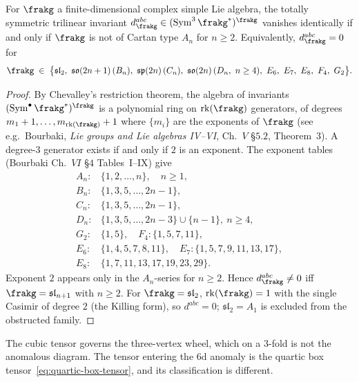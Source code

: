\begin{lemma}[Classification of simple $\frakg$ with $d^{abc}_\frakg = 0$]
\label{lem:dabc-vanishing-classification}
For $\frakg$ a finite-dimensional complex simple Lie algebra, the
totally symmetric trilinear invariant
$d^{abc}_\frakg \in (\operatorname{Sym}^3 \frakg^*)^\frakg$
vanishes identically if and only if $\frakg$ is not of Cartan type
$A_n$ for $n \geq 2$. Equivalently, $d^{abc}_\frakg = 0$ for
\[
 \frakg \;\in\; \bigl\{ \mathfrak{sl}_2,\ \mathfrak{so}(2n+1)\,(B_n),\ \mathfrak{sp}(2n)\,(C_n),\ \mathfrak{so}(2n)\,(D_n,\ n \geq 4),\ E_6,\ E_7,\ E_8,\ F_4,\ G_2 \bigr\}.
\]
\end{lemma}

\begin{proof}
By Chevalley's restriction theorem, the algebra of invariants
$(\operatorname{Sym}^\bullet \frakg^*)^\frakg$ is a polynomial ring on
$\operatorname{rk}(\frakg)$ generators, of degrees $m_1 + 1, \ldots, m_{\operatorname{rk}(\frakg)} + 1$
where $\{m_i\}$ are the exponents of $\frakg$ (see e.g.~Bourbaki,
\emph{Lie groups and Lie algebras IV--VI}, Ch.~$V$ \S$5.2$, Theorem~$3$).
A degree-$3$ generator exists if and only if $2$ is an exponent. The
exponent tables (Bourbaki Ch.~$VI$ \S$4$ Tables~I--IX) give
\[
\begin{array}{rl}
A_n: & \{1, 2, \ldots, n\}, \quad n \geq 1, \\
B_n: & \{1, 3, 5, \ldots, 2n-1\}, \\
C_n: & \{1, 3, 5, \ldots, 2n-1\}, \\
D_n: & \{1, 3, 5, \ldots, 2n-3\} \cup \{n - 1\},\ n \geq 4, \\
G_2: & \{1, 5\}, \quad F_4: \{1, 5, 7, 11\}, \\
E_6: & \{1, 4, 5, 7, 8, 11\}, \quad E_7: \{1, 5, 7, 9, 11, 13, 17\}, \\
E_8: & \{1, 7, 11, 13, 17, 19, 23, 29\}.
\end{array}
\]
Exponent $2$ appears only in the $A_n$-series for $n \geq 2$. Hence
$d^{abc}_\frakg \neq 0$ iff $\frakg = \mathfrak{sl}_{n+1}$ with $n \geq 2$.
For $\frakg = \mathfrak{sl}_2$, $\operatorname{rk}(\frakg) = 1$ with the
single Casimir of degree $2$ (the Killing form), so $d^{abc} = 0$;
$\mathfrak{sl}_2 = A_1$ is excluded from the obstructed family.
\end{proof}

The cubic tensor governs the three-vertex wheel, which on a $3$-fold
is not the anomalous diagram. The tensor entering the $6$d anomaly is
the quartic box tensor~\eqref{eq:quartic-box-tensor}, and its
classification is different.

